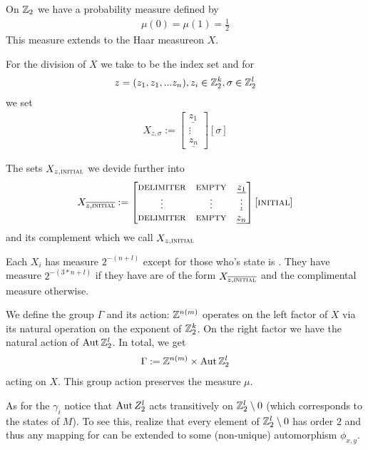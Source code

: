 On $\mathbb{Z}_2$ we have a probability measure defined by
\begin{align*}
	\mu(0) = \mu(1) = \frac12
\end{align*}
This measure extends to the Haar measure\footnotemark on $X$.

For the division of $X$ we take  to be the index set and for
\begin{align*}
	z = (z_1,z_1,...z_n), z_i \in \mathbb{Z}_2^k, \sigma \in \mathbb{Z}_2^l
\end{align*}
we set
\begin{align*}
	X_{z,\sigma} :=
	\begin{bmatrix}
		\underline{z_{1}} \\
		\vdots \\
		\underline{z_{n}}
	\end{bmatrix} [ \sigma ]
\end{align*}

The sets $X_{z,\text{\scshape{initial}}}$ we devide further into
\begin{align*}
	X_{\overline{z,\text{\scshape{initial}}}} :=
	\begin{bmatrix}
		\text{\scshape{delimiter}} & \text{\scshape{empty}} & \underline{z_1} \\
		\vdots & \vdots & \underline\vdots \\
		\text{\scshape{delimiter}} & \text{\scshape{empty}} & \underline{z_n} \\
	\end{bmatrix} [ \text{\scshape{initial}} ]
\end{align*}
and its complement which we call $X_{z,\text{\scshape{initial}}}$

\begin{Remark}
	Each $X_i$ has measure $2^{-(n+l)}$ except for those who's state is \INI. They have measure $2^{-(3*n+l)}$ if they have are of the form $X_{\overline{z,\text{\scshape{initial}}}}$ and the complimental measure otherwise.
\end{Remark}

We define the group $\Gamma$ and its action:
$\mathbb{Z}^{n(m)}$ operates on the left factor of $X$ via its natural operation on the exponent of $\mathbb{Z}_2^k$.
On the right factor we have the natural action of $\operatorname{Aut} \mathbb{Z}_2^l$.
In total, we get
\begin{align*}
	\Gamma := \mathbb{Z}^{n(m)} \times \operatorname{Aut} \mathbb{Z}_2^l
\end{align*}
acting on $X$.
This group action preserves the measure $\mu$.

As for the $\gamma_i$ notice that
$\operatorname{Aut} Z_2^l$ acts transitively on $\mathbb{Z}_2^l \setminus 0$ (which corresponds to the states of $M$).
To see this, realize that every element of $\mathbb{Z}_2^l \setminus 0$ has order $2$ and thus any mapping  for  can be extended to some (non-unique) automorphism $\phi_{x,y}$.


